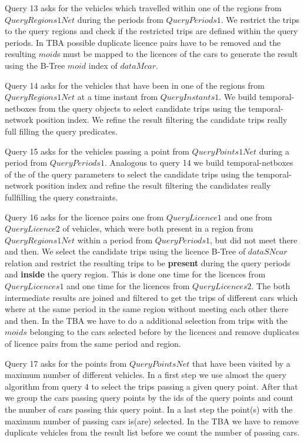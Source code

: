 \documentclass[a4paper]{article}
\newcommand{\op}[1]{\textbf{#1}}
\begin{document}
{Query 13 asks for the vehicles which travelled within one of the regions from
$QueryRegions1Net$ during the periods from $QueryPeriods1$. We restrict the trips
to the query regions and check if the restricted trips are defined within the query
periods. In TBA possible duplicate licence pairs have to be removed and the
resulting $moid$s must be mapped to the licences of the cars to generate the result
using the B-Tree $moid$ index of $dataMcar$.

Query 14 asks for the vehicles that have been in one of the regions from $QueryRegions1Net$
at a time instant from $QueryInstants1$. We build temporal-netboxes from the query
objects to select candidate trips using the temporal-network position index. We refine the
result filtering the candidate trips really full filling the query predicates.

Query 15 asks for the vehicles passing a point from $QueryPoints1Net$ during a period
from $QueryPeriods1$. Analogous to query 14 we build temporal-netboxes of the
of the query parameters to select the candidate trips using the temporal-network
position index and refine the result filtering the candidates really fullfilling
the query constraints.

Query 16 asks for the licence pairs one from $QueryLicence1$ and one from $QueryLicence2$
of vehicles, which were both present in a region from $QueryRegions1Net$ within a period
from $QueryPeriods1$, but did not meet there and then. We select the candidate trips
using the licence B-Tree of $dataSNcar$ relation and restrict the resulting trips to be
\op{present} during the query periods and \op{inside} the query region. This is done
one time for the licences from $QueryLicences1$ and one time for the licences from
$QueryLicences2$. The both intermediate results are joined and filtered to get the
trips of different cars which where at the same period in the same region
without meeting each other there and then. In the TBA we have
to do a additional selection from trips with the $moids$ belonging to the cars
selected before by the licences and remove duplicates of licence pairs from the
same period and region.

Query 17 asks for the points from $QueryPointsNet$ that have been visited by a
maximum number of different vehicles. In a first step we use almost the query
algorithm from query 4 to select the trips passing a given query
point. After that we group the cars passing query points by the ids of the
query points and count the number of cars passing this query point. In a last
step the point(s) with the maximum number of passing cars is(are) selected.
In the TBA we have to remove duplicate vehicles from the result list before we
count the number of passing cars.
}
\end{document}
